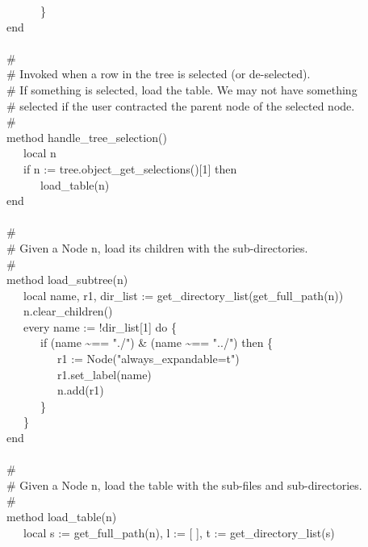 {\>   \ \ \ \ \ \ \} \\
\>   end \\
\ \\
\>   \# \\
\>   \# Invoked when a row in the tree is selected (or de-selected). \\
\>   \# If something is selected, load the table. We may not have something\\
\>   \# selected if the user contracted the parent node of the selected node. \\
\>   \# \\
\>   method handle\_tree\_selection() \\
\>   \ \ \ local n \\
\>   \ \ \ if n := tree.object\_get\_selections()[1] then \\
\>   \ \ \ \ \ \ load\_table(n) \\
\>   end \\
\ \\
\>   \# \\
\>   \# Given a Node n, load its children with the sub-directories. \\
\>   \# \\
\>   method load\_subtree(n) \\
\>   \ \ \ local name, r1, dir\_list := get\_directory\_list(get\_full\_path(n)) \\
\>   \ \ \ n.clear\_children() \\
\>   \ \ \ every name := !dir\_list[1] do \{ \\
\>   \ \ \ \ \ \ if (name \~{}== "./") \&
(name \~{}== "../") then \{ \\
\>   \ \ \ \ \ \ \ \ \ r1 :=
Node("always\_expandable=t") \\
\>   \ \ \ \ \ \ \ \ \ r1.set\_label(name) \\
\>   \ \ \ \ \ \ \ \ \ n.add(r1) \\
\>   \ \ \ \ \ \ \} \\
\>   \ \ \ \} \\
\>   end \\
\ \\
\>   \# \\
\>   \# Given a Node n, load the table with the sub-files and sub-directories.\\
\>   \# \\
\>   method load\_table(n) \\
\>   \ \ \ local s := get\_full\_path(n), l := [ ], t := get\_directory\_list(s) \\
}

